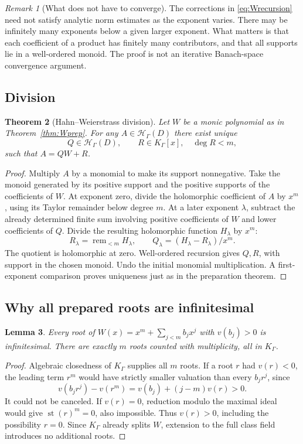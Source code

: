 \documentclass[11pt,a4paper]{article}
\newtheorem{theorem}{Theorem}[section]
\newtheorem{lemma}[theorem]{Lemma}
\theoremstyle{definition}
\theoremstyle{remark}
\newtheorem{remark}[theorem]{Remark}
\newcommand{\HH}{\mathcal H}
\newcommand{\st}{\operatorname{st}}
\newcommand{\remm}{\operatorname{rem}_{<m}}
\begin{document}
\begin{remark}[What does not have to converge]
The corrections in \eqref{eq:Wrecursion} need not satisfy analytic
norm estimates as the exponent varies. There may be infinitely many
exponents below a given larger exponent. What matters is that each
coefficient of a product has finitely many contributors, and that all
supports lie in a well-ordered monoid. The proof is not an iterative
Banach-space convergence argument.
\end{remark}

\subsection{Division}
\begin{theorem}[Hahn--Weierstrass division]\label{thm:Wdivision}
Let $W$ be a monic polynomial as in Theorem~\ref{thm:Wprep}. For
any $A\in\HH_\Gamma(D)$ there exist unique
\[
 Q\in\HH_\Gamma(D),\qquad R\in K_\Gamma[x],\quad\deg R<m,
\]
such that $A=QW+R$.
\end{theorem}
\begin{proof}
Multiply $A$ by a monomial to make its support nonnegative. Take the
monoid generated by its positive support and the positive supports
of the coefficients of $W$. At exponent zero, divide the holomorphic
coefficient of $A$ by $x^m$, using its Taylor remainder below degree
$m$. At a later exponent $\lambda$, subtract the already determined
finite sum involving positive coefficients of $W$ and lower
coefficients of $Q$. Divide the resulting holomorphic function
$H_\lambda$ by $x^m$:
\[
 R_\lambda=\remm H_\lambda,\qquad
 Q_\lambda=(H_\lambda-R_\lambda)/x^m.
\]
The quotient is holomorphic at zero. Well-ordered recursion gives
$Q,R$, with support in the chosen monoid. Undo the initial monomial
multiplication. A first-exponent comparison proves uniqueness just as
in the preparation theorem.
\end{proof}

\subsection{Why all prepared roots are infinitesimal}
\begin{lemma}\label{lem:smallroots}
Every root of
$W(x)=x^m+\sum_{j<m}b_jx^j$ with $v(b_j)>0$ is infinitesimal.
There are exactly $m$ roots counted with multiplicity, all in
$K_\Gamma$.
\end{lemma}
\begin{proof}
Algebraic closedness of $K_\Gamma$ supplies all $m$ roots. If a root
$r$ had $v(r)<0$, the leading term $r^m$ would have strictly smaller
valuation than every $b_jr^j$, since
\[
 v(b_jr^j)-v(r^m)=v(b_j)+(j-m)v(r)>0.
\]
It could not be canceled. If $v(r)=0$, reduction modulo the maximal
ideal would give $\st(r)^m=0$, also impossible. Thus $v(r)>0$,
including the possibility $r=0$. Since $K_\Gamma$ already splits
$W$, extension to the full class field introduces no additional roots.
\end{proof}
\end{document}
